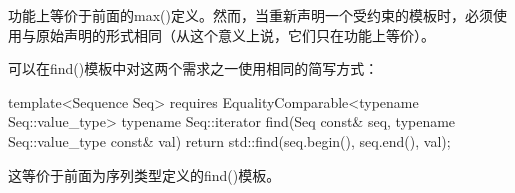 功能上等价于前面的max()定义。然而，当重新声明一个受约束的模板时，必须使用与原始声明的形式相同（从这个意义上说，它们只在功能上等价）。

可以在find()模板中对这两个需求之一使用相同的简写方式：

\begin{cpp}
template<Sequence Seq>
	requires EqualityComparable<typename Seq::value_type>
typename Seq::iterator find(Seq const& seq,
							typename Seq::value_type const& val)
{
	return std::find(seq.begin(), seq.end(), val);
}
\end{cpp}

这等价于前面为序列类型定义的find()模板。





